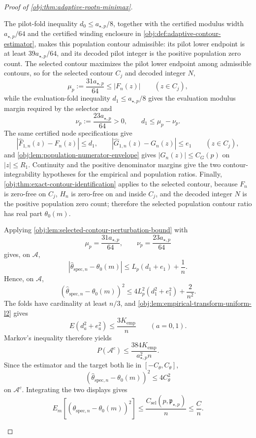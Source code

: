 \documentclass[11pt]{article}
\begin{document}
\begin{proof}[Proof of \cref{obj:thm:adaptive-rootn-minimax}]
\begin{enumerate}
The pilot-fold inequality \(d_0\le a_{\star,p}/8\), together with the certified modulus width \(a_{\star,p}/64\) and the certified winding enclosure in \cref{obj:def:adaptive-contour-estimator}, makes this population contour admissible: its pilot lower endpoint is at least \(39a_{\star,p}/64\), and its decoded pilot integer is the positive population zero count.  The selected contour maximizes the pilot lower endpoint among admissible contours, so for the selected contour \(C_j\) and decoded integer \(N\),
\[
\mu_p:=\frac{31a_{\star,p}}{64}\le |F_n(z)|
\qquad (z\in C_j),
\]
while the evaluation-fold inequality \(d_1\le a_{\star,p}/8\) gives the evaluation modulus margin required by the selector and
\[
\nu_p:=\frac{23a_{\star,p}}{64}>0,
\qquad
 d_1\le \mu_p-\nu_p.
\]
The same certified node specifications give
\[
|\widehat F_{1,n}(z)-F_n(z)|\le d_1,
\qquad
|\widehat G_{1,n}(z)-G_n(z)|\le e_1
\qquad (z\in C_j),
\]
and \cref{obj:lem:population-numerator-envelope} gives \(|G_n(z)|\le C_G(p)\) on \(|z|\le R_1\).  Continuity and the positive denominator margins give the two contour-integrability hypotheses for the empirical and population ratios.  Finally, \cref{obj:thm:exact-contour-identification} applies to the selected contour, because \(F_n\) is zero-free on \(C_j\), \(H_n\) is zero-free on and inside \(C_j\), and the decoded integer \(N\) is the positive population zero count; therefore the selected population contour ratio has real part \(\theta_0(m)\).

Applying \cref{obj:lem:selected-contour-perturbation-bound} with
\[
\mu_p=\frac{31a_{\star,p}}{64},
\qquad
\nu_p=\frac{23a_{\star,p}}{64}
\]
gives, on \(\mathcal A\),
\[
|\widehat\theta_{\mathrm{spec},n}-\theta_0(m)|
\le
L_p(d_1+e_1)+\frac1n.
\]
Hence, on \(\mathcal A\),
\[
(\widehat\theta_{\mathrm{spec},n}-\theta_0(m))^2
\le
4L_p^2(d_1^2+e_1^2)+\frac{2}{n^2}.
\]
The folds have cardinality at least \(n/3\), and \cref{obj:lem:empirical-transform-uniform-l2} gives
\[
E(d_a^2+e_a^2)\le \frac{3K_{\mathrm{emp}}}{n}
\qquad(a=0,1).
\]
Markov's inequality therefore yields
\[
P(\mathcal A^c)
\le
\frac{384K_{\mathrm{emp}}}{a_{\star,p}^2n}.
\]
Since the estimator and the target both lie in \([-C_{\theta},C_{\theta}]\),
\[
(\widehat\theta_{\mathrm{spec},n}-\theta_0(m))^2\le 4C_{\theta}^2
\]
on \(\mathcal A^c\).  Integrating the two displays gives
\[
E_m\!\left[
(\widehat\theta_{\mathrm{spec},n}-\theta_0(m))^2
\right]
\le
\frac{C_{\mathrm{sel}}(p,\mathfrak p_{\star,p})}{n}
\le
\frac{C}{n}.
\] %


\end{enumerate}
\end{proof}
\end{document}
